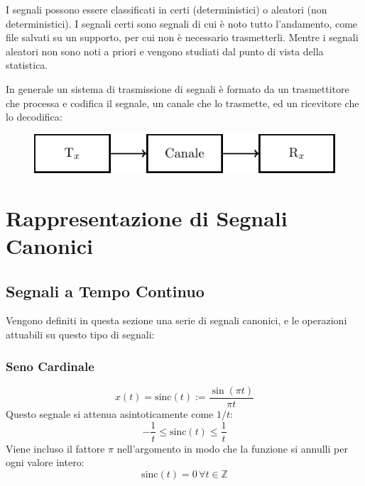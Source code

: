 \documentclass{article}
\newcommand{\sinc}{\mathrm{sinc}}
\numberwithin{equation}{subsection}
\begin{document}
I segnali possono essere classificati in certi (deterministici) o aleatori (non deterministici). I segnali certi sono segnali di cui è noto tutto l'andamento, come file salvati su un supporto, per cui non è necessario 
trasmetterli. Mentre i segnali aleatori non sono noti a priori e vengono studiati dal punto di vista della statistica. 

In generale un sistema di trasmissione di segnali è formato da un trasmettitore che processa e codifica il segnale, un canale che lo trasmette, ed un ricevitore che lo decodifica:
\begin{figure}[H]%
    \centering
    \includegraphics{canale-trasmissione.pdf}%
    \label{fig:canale-trasmissione}
\end{figure}

\clearpage

\section{Rappresentazione di Segnali Canonici}

\subsection{Segnali a Tempo Continuo}

Vengono definiti in questa sezione una serie di segnali canonici, e le operazioni attuabili su questo tipo di segnali:

\subsubsection{Seno Cardinale}

\begin{equation}
    x(t)=\sinc(t):=\displaystyle\frac{\sin(\pi t)}{\pi t}
\end{equation}
Questo segnale si attenua asintoticamente come $1/t$: 
\begin{equation*}
    \displaystyle-\frac{1}{t}\leq\sinc(t)\leq\frac{1}{t}
\end{equation*}
Viene incluso il fattore $\pi$ nell'argomento in modo che la funzione si annulli per ogni valore intero:
\begin{equation*}
    \sinc(t)=0\,\forall t\in\mathbb{Z}
\end{equation*}
\end{document}
